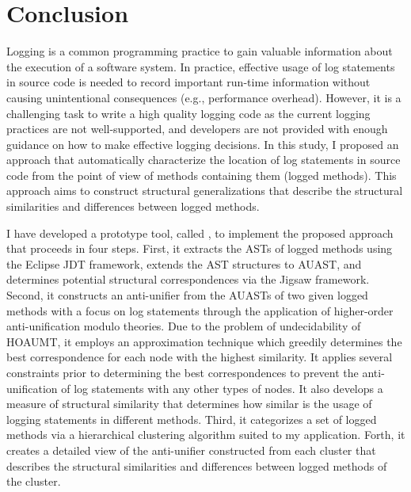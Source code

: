 
\chapter{Conclusion}  \label{conc}

Logging is a common programming practice to gain valuable information about the execution of a software system. In practice, effective usage of log statements in source code is needed to record important run-time information without causing unintentional consequences (e.g., performance overhead). However, it is a challenging task to write a high quality logging code as the current logging practices are not well-supported, and developers are not provided with enough guidance on how to make effective logging decisions. In this study, I proposed an approach that automatically characterize the location of log statements in source code from the point of view of methods containing them (logged methods). This approach aims to construct structural generalizations that describe the structural similarities and differences between logged methods.


I have developed a prototype tool, called , to implement the proposed approach that proceeds in four steps. First, it extracts the ASTs of logged methods using the Eclipse JDT framework, extends the AST structures to AUAST, and determines potential structural correspondences via the Jigsaw framework. Second, it constructs an anti-unifier from the AUASTs of two given logged methods with a focus on log statements through the application of higher-order anti-unification modulo theories. Due to the problem of undecidability of HOAUMT, it employs an approximation technique which greedily determines the best correspondence for each node with the highest similarity. It applies several constraints prior to determining the best correspondences to prevent the anti-unification of log statements with any other types of nodes. It also develops a measure of structural similarity that determines how similar is the usage of logging statements in different methods. Third, it categorizes a set of logged methods via a hierarchical clustering algorithm suited to my application. Forth, it creates a detailed view of the anti-unifier constructed from each cluster that describes the structural similarities and differences between logged methods of the cluster. 

